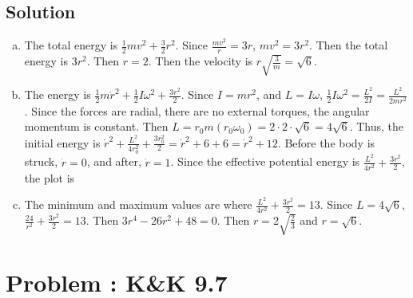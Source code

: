 \documentclass[solutions]{esg8012pset}
\begin{document}
\subsection{Solution}
\begin{enumerate}[(a)]
  \item The total energy is $\frac{1}{2}mv^2 + \frac{3}{2}r^2$.  Since $\frac{m v^2}{r} = 3r$, $m v^2 = 3r^2$.  Then the total energy is $3r^2$.  Then $r = 2$.  Then the velocity is $r\sqrt{\frac{3}{m}} = \sqrt{6}$.
  \item The energy is $\frac{1}{2}m\dot r^2 + \frac{1}{2}I\omega^2 + \frac{3r^2}{2}$.  Since $I = mr^2$, and $L = I\omega$, $\frac{1}{2}I\omega^2 = \frac{L^2}{2I} = \frac{L^2}{2mr^2}$.  Since the forces are radial, there are no external torques, the angular momentum is constant.  Then $L = r_0m(r_0\omega_0) = 2\cdot 2 \cdot \sqrt{6} = 4\sqrt{6}$.  Thus, the initial energy is $\dot r^2 + \frac{L^2}{4r_0^2} + \frac{3r_0^2}{2} = \dot r^2 + 6 + 6 = \dot r^2 + 12$.  Before the body is struck, $\dot r = 0$, and after, $\dot r = 1$.  Since the effective potential energy is $\frac{L^2}{4r^2} + \frac{3r^2}{2}$, the plot is \par
{}
  \item The minimum and maximum values are where $\frac{L^2}{4r^2} + \frac{3r^2}{2} = 13$.  Since $L = 4\sqrt{6}$, $\frac{24}{r^2} + \frac{3r^2}{2} = 13$.  Then $3 r^4 - 26 r^2 + 48 = 0$.  Then $r = 2\sqrt{\frac{2}{3}}$ and $r = \sqrt{6}$.
\end{enumerate}
\section{Problem \thesection: K\&K 9.7}
\end{document}

